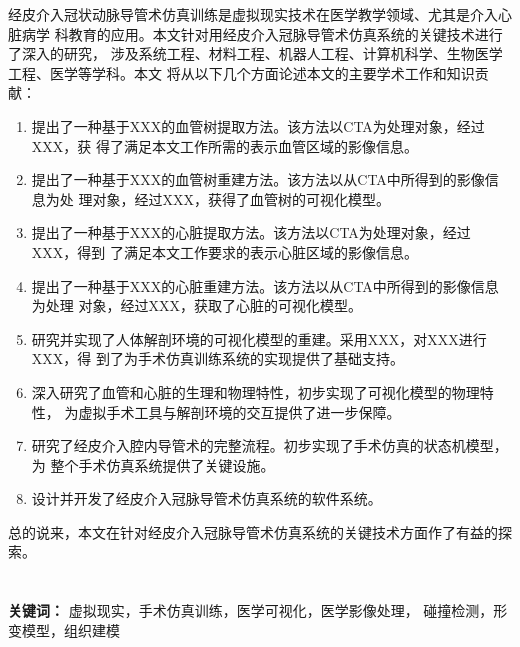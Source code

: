 经皮介入冠状动脉导管术仿真训练是虚拟现实技术在医学教学领域、尤其是介入心脏病学
科教育的应用。本文针对用经皮介入冠脉导管术仿真系统的关键技术进行了深入的研究，
涉及系统工程、材料工程、机器人工程、计算机科学、生物医学工程、医学等学科。本文
将从以下几个方面论述本文的主要学术工作和知识贡献：
\begin{enumerate}
    \item 提出了一种基于XXX的血管树提取方法。该方法以CTA为处理对象，经过XXX，获
    得了满足本文工作所需的表示血管区域的影像信息。
    \item 提出了一种基于XXX的血管树重建方法。该方法以从CTA中所得到的影像信息为处
    理对象，经过XXX，获得了血管树的可视化模型。
    \item 提出了一种基于XXX的心脏提取方法。该方法以CTA为处理对象，经过XXX，得到
    了满足本文工作要求的表示心脏区域的影像信息。
    \item 提出了一种基于XXX的心脏重建方法。该方法以从CTA中所得到的影像信息为处理
    对象，经过XXX，获取了心脏的可视化模型。
    \item 研究并实现了人体解剖环境的可视化模型的重建。采用XXX，对XXX进行XXX，得
    到了为手术仿真训练系统的实现提供了基础支持。
    \item 深入研究了血管和心脏的生理和物理特性，初步实现了可视化模型的物理特性，
    为虚拟手术工具与解剖环境的交互提供了进一步保障。
    \item 研究了经皮介入腔内导管术的完整流程。初步实现了手术仿真的状态机模型，为
    整个手术仿真系统提供了关键设施。
    \item 设计并开发了经皮介入冠脉导管术仿真系统的软件系统。
\end{enumerate}
总的说来，本文在针对经皮介入冠脉导管术仿真系统的关键技术方面作了有益的探索。
\\
\\
\\
\noindent \textbf{关键词：} 虚拟现实，手术仿真训练，医学可视化，医学影像处理，
碰撞检测，形变模型，组织建模
